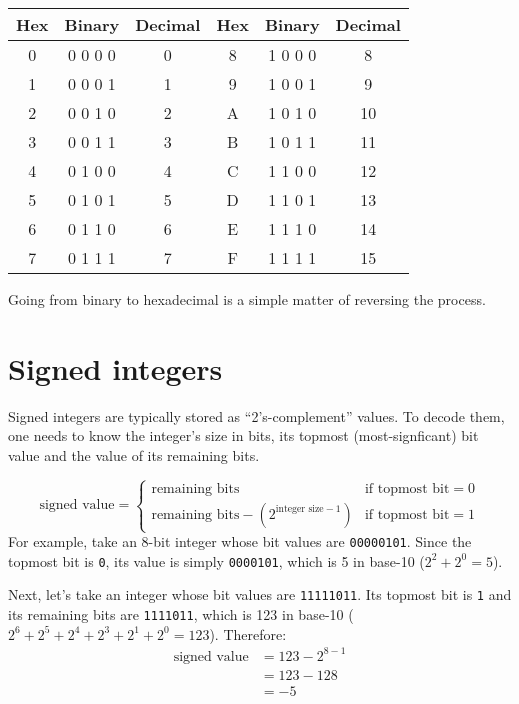 
\begin{tabular}{| c | c | c || c | c | c |}
\hline
Hex & Binary & Decimal & Hex & Binary & Decimal \\
\hline
0 & 0 0 0 0 & 0 & 8 & 1 0 0 0 & 8 \\
1 & 0 0 0 1 & 1 & 9 & 1 0 0 1 & 9 \\
2 & 0 0 1 0 & 2 & A & 1 0 1 0 & 10 \\
3 & 0 0 1 1 & 3 & B & 1 0 1 1 & 11 \\
4 & 0 1 0 0 & 4 & C & 1 1 0 0 & 12 \\
5 & 0 1 0 1 & 5 & D & 1 1 0 1 & 13 \\
6 & 0 1 1 0 & 6 & E & 1 1 1 0 & 14 \\
7 & 0 1 1 1 & 7 & F & 1 1 1 1 & 15 \\
\hline
\end{tabular}
\begin{flushleft}
Going from binary to hexadecimal is a simple matter of reversing
the process.
\end{flushleft}

\section{Signed integers}
Signed integers are typically stored as ``2's-complement'' values.
To decode them, one needs to know the integer's size in bits, its
topmost (most-signficant) bit value and the value of its remaining bits.

\begin{equation}
\text{signed value} =
\begin{cases}
\text{remaining bits} & \text{if topmost bit} = 0 \\
\text{remaining bits} - (2 ^ {\text{integer size} - 1}) & \text{if topmost bit} = 1
\end{cases}
\end{equation}
For example, take an 8-bit integer whose bit values are \texttt{00000101}.
Since the topmost bit is \texttt{0}, its value is simply \texttt{0000101},
which is 5 in base-10 ($2 ^ 2 + 2 ^ 0 = 5$).

Next, let's take an integer whose bit values are \texttt{11111011}.
Its topmost bit is \texttt{1} and its remaining bits are \texttt{1111011},
which is 123 in base-10
($2 ^ 6 + 2 ^ 5 + 2 ^ 4 + 2 ^ 3 + 2 ^ 1 + 2 ^ 0 = 123$).
Therefore:
\begin{align*}
\text{signed value} &= 123 - 2 ^ {8 - 1} \\
 &= 123 - 128 \\
 &= -5
\end{align*}

